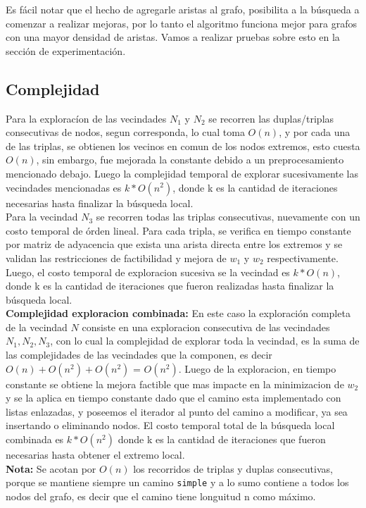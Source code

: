 Es f\'acil notar que el hecho de agregarle aristas al grafo, posibilita a la b\'usqueda a comenzar a realizar mejoras, por lo tanto el algoritmo funciona mejor para grafos con una mayor densidad de aristas. Vamos a realizar pruebas sobre esto en la secci\'on de experimentaci\'on.

\subsection{Complejidad}
Para la explorac\'ion de las vecindades $N_1$ y $N_2$ se recorren las duplas/triplas consecutivas de nodos, segun corresponda, lo cual toma $O(n)$, y por cada una de las triplas, se obtienen los vecinos en comun de los nodos extremos, esto cuesta $O(n)$, sin embargo, fue mejorada la constante debido a un preprocesamiento mencionado debajo. Luego la complejidad temporal de explorar sucesivamente las vecindades mencionadas es $k*O(n^2)$, donde k es la cantidad de iteraciones necesarias hasta finalizar la b\'usqueda local.\\
Para la vecindad $N_3$ se recorren todas las triplas consecutivas, nuevamente con un costo temporal de \'orden lineal. Para cada tripla, se verifica en tiempo constante por matriz de adyacencia que exista una arista directa entre los extremos y se validan las restricciones de factibilidad y mejora de $w_1$ y $w_2$ respectivamente. Luego, el costo temporal de exploracion sucesiva se la vecindad es $k*O(n)$, donde k es la cantidad de iteraciones que fueron realizadas hasta finalizar la b\'usqueda local.\\

\textbf{Complejidad exploracion combinada:} En este caso la exploraci\'on completa de la vecindad $N$ consiste en una exploracion consecutiva de las vecindades $N_1, N_2, N_3$, con lo cual la complejidad de explorar toda la vecindad, es la suma de las complejidades de las vecindades que la componen, es decir $O(n) + O(n^2) + O(n^2) $ = $ O(n^2)$. Luego de la exploracion, en tiempo constante se obtiene la mejora factible que mas impacte en la minimizacion de $w_2$ y se la aplica en tiempo constante dado que el camino esta implementado con listas enlazadas, y poseemos el iterador al punto del camino a modificar, ya sea insertando o eliminando nodos. El costo temporal total de la b\'usqueda local combinada es $k*O(n^2)$ donde k es la cantidad de iteraciones que fueron necesarias hasta obtener el extremo local.\\

\textbf{Nota:} Se acotan por $O(n)$ los recorridos de triplas y duplas consecutivas, porque se mantiene siempre un camino \texttt{simple} y a lo sumo contiene a todos los nodos del grafo, es decir que el camino tiene longuitud n como m\'aximo. 

